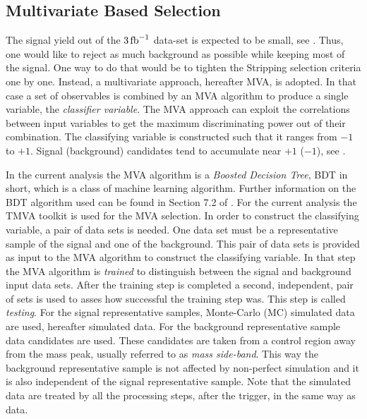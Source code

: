 \subsection{Multivariate Based Selection}
\label{Multivariate_Based_Selection}

The \BsJpsiKst signal yield out of the $3 \mbox{\,fb}^{-1}$ data-set is expected to be small, see . Thus, one would like to
reject as much background as possible while keeping most of the signal. One way to do that would be to tighten the Stripping
selection criteria one by one. Instead, a multivariate approach, hereafter MVA, is adopted.
In that case a set of observables is combined by an MVA algorithm to produce a single variable, the {\it classifier variable}.
The MVA approach can exploit the correlations between input variables to get the maximum discriminating power out of their combination.
The classifying variable is constructed such that it ranges from $-1$ to $+1$. Signal (background) candidates tend to
accumulate near $+1$ ($-1$), see .

In the current analysis the MVA algorithm is a {\it Boosted Decision Tree}, BDT in short, which is a class
of machine learning  algorithm. Further information on the BDT algorithm used can be found in Section 7.2 of \cite{TMVA}.
For the current analysis the TMVA toolkit \cite{TMVA} is used for the MVA selection. In order to construct the classifying variable,
a pair of data sets is needed. One data set must be a representative sample of the signal and one of the background.
This pair of data sets is provided as input to the MVA algorithm to construct the classifying variable.
In that step the MVA algorithm is {\it trained} to distinguish between the signal and background input data sets.
After the training step is completed a second, independent, pair of sets is used to asses how
successful the training step was. This step is called {\it testing}.
For the signal representative samples, \BsJpsiKst Monte-Carlo (MC) simulated data are used, hereafter simulated data.
For the background representative sample data candidates are used. These candidates are taken from a control
region away from the \BsJpsiKst mass peak, usually referred to as {\it mass side-band}. This way the background representative sample
is not affected by non-perfect simulation and it is also independent of the signal representative sample.
Note that the simulated data are treated by all the processing steps, after the \lzero trigger, in the same way as data.


